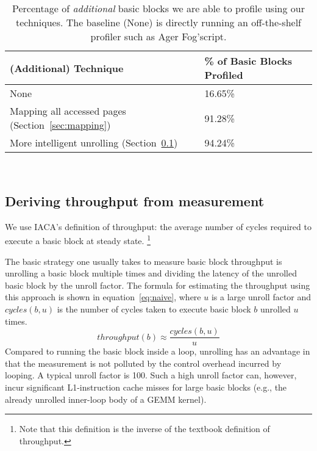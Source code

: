 %
%

\begin{table}
\begin{tabular}{
|p{}|p{}|}
\hline
\textbf{(Additional) Technique} & \textbf{\% of Basic Blocks Profiled} \\
\hline
None & 16.65\% \\

\hline
Mapping all accessed pages (Section~\ref{sec:mapping}) & 91.28\%\\

\hline
More intelligent unrolling (Section~\ref{sec:unrolling}) & 94.24\%\\

\hline
\end{tabular}
\\
\caption{Percentage of \textit{additional} basic blocks we are able to
profile using our techniques.
The baseline (None) is directly running an off-the-shelf profiler such as Ager Fog'script.}
\label{tab:full-ablation}
\end{table}


\subsection{Deriving throughput from measurement}\label{sec:unrolling}
We use IACA's definition of throughput:
the average number of cycles required to execute a basic block 
at steady state.
\footnote{Note that this definition is the inverse of the textbook definition of throughput.}

The basic strategy one usually takes to measure basic block throughput
is unrolling a basic block multiple times and dividing the latency of the
unrolled basic block by the unroll factor.
The formula for estimating the throughput using this approach is shown
in equation~\ref{eq:naive}, where $u$ is a large unroll factor
and $\mathit{cycles}(b,u)$ is the number of cycles taken to execute basic block $b$
unrolled $u$ times.
\begin{equation}
\mathit{throughput}(b) \approx \frac{\mathit{cycles}(b,u)}{u}
\label{eq:naive}
\end{equation}
Compared to running the basic block inside a loop,
unrolling has an advantage in that the measurement is not polluted by
the control overhead incurred by looping.
A typical unroll factor is 100\cite{ithemal,uops}.
Such a high unroll factor can, however, incur significant
L1-instruction cache misses for large basic blocks
(e.g., the already unrolled inner-loop body of a GEMM kernel).

